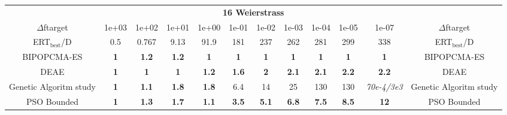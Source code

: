 \begin{tabular}{cccccccccccc}
 & \multicolumn{10}{c}{{\normalsize \textbf{16 Weierstrass}}}\\
$\Delta$ftarget& 1e+03& 1e+02& 1e+01& 1e+00& 1e-01& 1e-02& 1e-03& 1e-04& 1e-05& 1e-07 & $\Delta$ftarget \\
ERT$_{\textrm{best}}$/D& 0.5& 0.767& 9.13& 91.9& 181& 237& 262& 281& 299& 338 & ERT$_{\textrm{best}}$/D \\
\hline
BIPOPCMA-ES & \textbf{1} & \textbf{1.2} & \textbf{1.2} & \textbf{1} & \textbf{1} & \textbf{1} & \textbf{1} & \textbf{1} & \textbf{1} & \textbf{1} & BIPOPCMA-ES \cite{add_an_entry_for_BIPOPCMA-ES_in_bbob.bib}\\
DEAE & \textbf{1} & \textbf{1} & \textbf{1} & \textbf{1.2} & \textbf{1.6} & \textbf{2} & \textbf{2.1} & \textbf{2.1} & \textbf{2.2} & \textbf{2.2} & DEAE \cite{add_an_entry_for_DEAE_in_bbob.bib}\\
Genetic Algoritm study & \textbf{1} & \textbf{1.1} & \textbf{1.8} & \textbf{1.8} & 6.4 & 14 & 25 & 130 & 130 & \textit{70e-4}\textit{/3e3} & Genetic Algoritm study \cite{add_an_entry_for_Genetic Algoritm study_in_bbob.bib}\\
PSO Bounded & \textbf{1} & \textbf{1.3} & \textbf{1.7} & \textbf{1.1} & \textbf{3.5} & \textbf{5.1} & \textbf{6.8} & \textbf{7.5} & \textbf{8.5} & \textbf{12} & PSO Bounded \cite{add_an_entry_for_PSO Bounded_in_bbob.bib}
\end{tabular}
